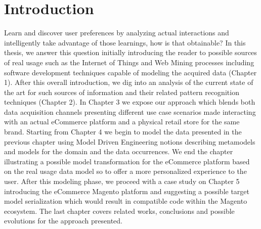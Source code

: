 
\chapter*{Introduction}

Learn and discover user preferences by analyzing actual interactions and intelligently take advantage of those learnings, how is that obtainable?  In this thesis, we answer this question initially introducing the reader to possible sources of real usage such as the Internet of Things and Web Mining processes including software development techniques capable of modeling the acquired data (Chapter 1).
After this overall introduction, we dig into an analysis of the current state of the art for such sources of information and their related pattern recognition techniques (Chapter 2).
In Chapter 3 we expose our approach which blends both data acquisition channels presenting different use case scenarios made interacting with an actual eCommerce platform and a physical retail store for the same brand.
Starting from Chapter 4 we begin to model the data presented in the previous chapter using Model Driven Engineering notions describing metamodels and models for the domain and the data occurrences. We end the chapter illustrating a possible model transformation for the eCommerce platform based on the real usage data model so to offer a more personalized experience to the user.
After this modeling phase, we proceed with a case study on Chapter 5 introducing the eCommerce Magento platform and suggesting a possible target model serialization which would result in compatible code within the Magento ecosystem.
The last chapter covers related works, conclusions and possible evolutions for the approach presented.

